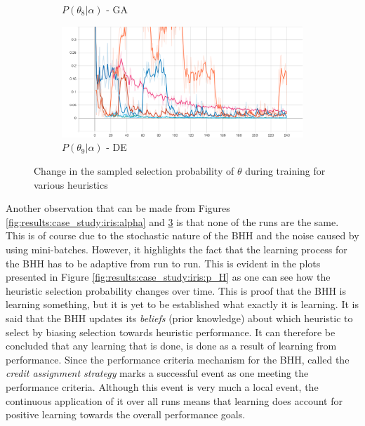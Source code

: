 \begin{figure}[htbp]
\begin{subfigure}{0.5\textwidth}
        \caption{$P(\theta_{8} | \alpha)$ - \Acs{GA}}
        \label{fig:results:case_study:iris:p_theta:8}
    \end{subfigure}
    \begin{subfigure}{0.5\textwidth}
        \centering
        \includegraphics[width=\textwidth]{analysis/bhh_case_study/iris/theta[9].png}
        \caption{$P(\theta_{9} | \alpha)$ - \Acs{DE}}
        \label{fig:results:case_study:iris:p_theta:9}
    \end{subfigure}
    \par\medskip
	\caption{Change in the sampled selection probability of $\theta$ during training for various heuristics}
	\label{fig:results:case_study:iris:p_theta}
\end{figure}








Another observation that can be made from Figures \ref{fig:results:case_study:iris:alpha} and \ref{fig:results:case_study:iris:p_theta} is that none of the runs are the same. This is of course due to the stochastic nature of the \Acs{BHH} and the noise caused by using mini-batches. However, it highlights the fact that the learning process for the \Acs{BHH} has to be adaptive from run to run. This is evident in the plots presented in Figure \ref{fig:results:case_study:iris:p_H} as one can see how the heuristic selection probability changes over time. This is proof that the \Ac{BHH} is learning something, but it is yet to be established what exactly it is learning. It is said that the \Acs{BHH} updates its \textit{beliefs} (prior knowledge) about which heuristic to select by biasing selection towards heuristic performance. It can therefore be concluded that any learning that is done, is done as a result of learning from performance. Since the performance criteria mechanism for the \Ac{BHH}, called the \textit{credit assignment strategy} marks a successful event as one meeting the performance criteria. Although this event is very much a local event, the continuous application of it over all runs means that learning does account for positive learning towards the overall performance goals.




